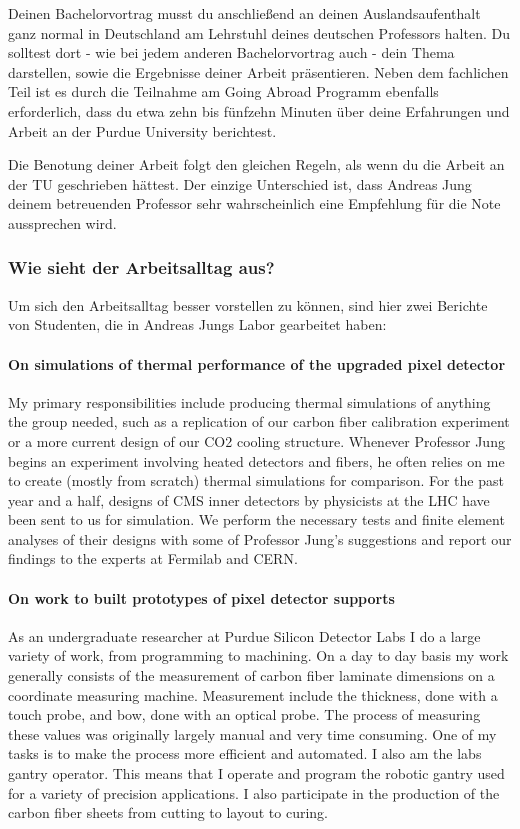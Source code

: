 \documentclass[
  paper=a4,
  fontsize=12pt,
  DIV=16,
  headheight=52pt,
  footheight=45pt,
  headinclude,
  parskip=full,
]{scrartcl}
\begin{document}
Deinen Bachelorvortrag musst du anschließend an deinen Auslandsaufenthalt ganz normal in Deutschland am Lehrstuhl deines deutschen Professors halten.
Du solltest dort - wie bei jedem anderen Bachelorvortrag auch - dein Thema
darstellen, sowie die Ergebnisse deiner Arbeit präsentieren.
Neben dem fachlichen Teil ist es durch die Teilnahme am Going Abroad Programm ebenfalls erforderlich, dass du etwa zehn bis fünfzehn Minuten über deine Erfahrungen und Arbeit an der Purdue University berichtest.

Die Benotung deiner Arbeit folgt den gleichen Regeln, als wenn du die Arbeit an der TU geschrieben hättest.
Der einzige Unterschied ist, dass Andreas Jung deinem betreuenden Professor sehr wahrscheinlich eine Empfehlung für die Note aussprechen wird.

\subsubsection*{Wie sieht der Arbeitsalltag aus?}
Um sich den Arbeitsalltag besser vorstellen zu können, sind hier zwei Berichte
von Studenten, die in Andreas Jungs Labor gearbeitet haben:

\paragraph{On simulations of thermal performance of the upgraded pixel detector}
My primary responsibilities include producing thermal simulations of anything the group needed, such as a replication of our carbon fiber calibration experiment or a more current design of our CO2 cooling structure.
Whenever Professor Jung begins an experiment involving heated detectors and fibers, he often relies on me to create (mostly from scratch) thermal simulations for comparison.
For the past year and a half, designs of CMS inner detectors by physicists at the LHC have been sent to us for simulation.
We perform the necessary tests and finite element analyses of their designs with some of Professor Jung’s suggestions and report our findings to the experts at Fermilab and CERN.

\paragraph{On work to built prototypes of pixel detector supports}
As an undergraduate researcher at Purdue Silicon Detector Labs I do a large variety of work, from programming to machining.
On a day to day basis my work generally consists of the measurement of carbon fiber laminate dimensions on a coordinate measuring machine.
Measurement include the thickness, done with a touch probe, and bow, done with an optical probe.
The process of measuring these values was originally largely manual and very time consuming.
One of my tasks is to make the process more efficient and automated.
I also am the labs gantry operator.
This means that I operate and program the robotic gantry used for a variety of precision applications.
I also participate in the production of the carbon fiber sheets from cutting to layout to curing.
\end{document}
